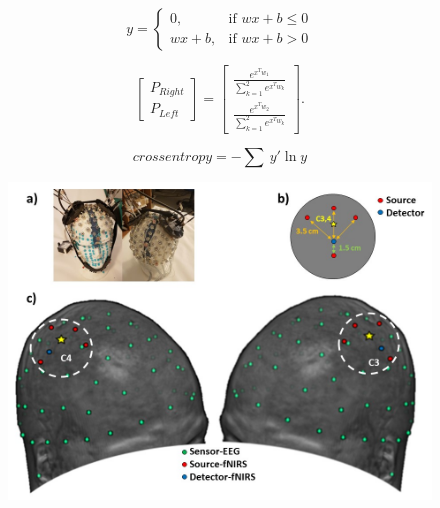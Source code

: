\documentclass[12pt ]{iopart}
\begin{document}
\begin{equation}
y= 
\begin{cases}
0,& \text{if } wx+b \leq 0\\
wx+b,&\text{if } wx+b > 0
\end{cases}
\end{equation}

\begin{equation}
\begin{bmatrix}
P_{Right}\\
P_{Left}
\end{bmatrix}
=
\begin{bmatrix}
\frac{e^{x^Tw_1}}{\sum\limits_{k=1}^2 e^{x^Tw_k}}\\
\frac{e^{x^Tw_2}}{\sum\limits_{k=1}^2 e^{x^Tw_k}}
\end{bmatrix}
.
\end{equation}

\begin{equation}
cross entropy= 
-\sum\ y'\ln y
\end{equation}

\begin{figure}
	\includegraphics[width=\linewidth]{Diapositiva1.JPG}
	\caption{}
	\label{fig:fig1}
\end{figure}
\end{document}
